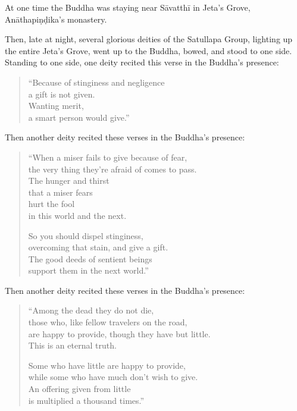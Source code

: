 \documentclass[12pt,openany]{book}%
\begin{document}
At one time the Buddha was staying near \textsanskrit{Sāvatthī} in Jeta’s Grove, \textsanskrit{Anāthapiṇḍika}’s monastery. 

Then, late at night, several glorious deities of the Satullapa Group, lighting up the entire Jeta’s Grove, went up to the Buddha, bowed, and stood to one side. Standing to one side, one deity recited this verse in the Buddha’s presence: 

\begin{verse}%
“Because of stinginess and negligence \\
a gift is not given. \\
Wanting merit, \\
a smart person would give.” 

%
\end{verse}

Then another deity recited these verses in the Buddha’s presence: 

\begin{verse}%
“When a miser fails to give because of fear, \\
the very thing they’re afraid of comes to pass. \\
The hunger and thirst \\
that a miser fears \\
hurt the fool \\
in this world and the next. 

So you should dispel stinginess, \\
overcoming that stain, and give a gift. \\
The good deeds of sentient beings \\
support them in the next world.” 

%
\end{verse}

Then another deity recited these verses in the Buddha’s presence: 

\begin{verse}%
“Among the dead they do not die, \\
those who, like fellow travelers on the road, \\
are happy to provide, though they have but little. \\
This is an eternal truth. 

Some who have little are happy to provide, \\
while some who have much don’t wish to give. \\
An offering given from little \\
is multiplied a thousand times.” 

%
\end{verse}
\end{document}
